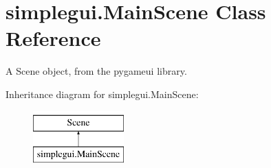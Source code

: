 \hypertarget{classsimplegui_1_1_main_scene}{\section{simplegui.\-Main\-Scene Class Reference}
\label{classsimplegui_1_1_main_scene}
}


A Scene object, from the pygameui library.  


Inheritance diagram for simplegui.\-Main\-Scene\-:\begin{figure}[H]
\begin{center}
\leavevmode
\includegraphics[height=2.000000cm]{classsimplegui_1_1_main_scene}
\end{center}
\end{figure}
